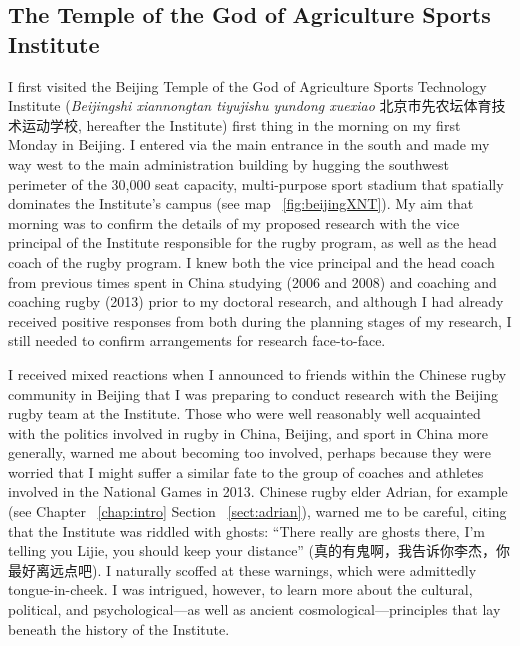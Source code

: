                                          \begin{CJK}{UTF8}{gbsn}

\section{The Temple of the God of Agriculture Sports Institute}
I first visited the Beijing Temple of the God of Agriculture Sports Technology Institute (\textit{Beijingshi xiannongtan tiyujishu yundong xuexiao} 北京市先农坛体育技术运动学校,
hereafter the Institute) first thing in the morning on my first Monday in Beijing.  I entered via the main entrance in the south and made my way west to the main administration building by hugging the southwest perimeter of the 30,000 seat capacity, multi-purpose sport stadium that spatially dominates the Institute's campus (see map ~\ref{fig:beijingXNT}). My aim that morning was to confirm the details of my proposed research with the vice principal of the Institute responsible for the rugby program, as well as the head coach of the rugby program.  I knew both the vice principal and the head coach from previous times spent in China studying (2006 and 2008) and coaching and coaching rugby (2013) prior to my doctoral research, and although I had already received positive responses from both during the planning stages of my research, I still needed to confirm arrangements for research face-to-face.

I received mixed reactions when I announced to friends within the Chinese rugby community in Beijing that I was preparing to conduct research with the Beijing rugby team at the Institute. Those who were well reasonably well acquainted with the politics involved in rugby in China, Beijing, and sport in China more generally, warned me about becoming too involved,  perhaps because they were worried that I might suffer a similar fate to the group of coaches and athletes involved in the National Games in 2013.  Chinese rugby elder Adrian, for example (see Chapter ~\ref{chap:intro} Section ~\ref{sect:adrian}), warned me to be careful, citing that the Institute was riddled with ghosts: ``There really are ghosts there, I'm telling you Lijie, you should keep your distance'' (真的有鬼啊，我告诉你李杰，你最好离远点吧).  I naturally scoffed at these warnings, which were admittedly tongue-in-cheek. I was intrigued, however, to learn more about the cultural, political, and psychological---as well as ancient cosmological---principles that lay beneath the history of the Institute.


\end{CJK}
